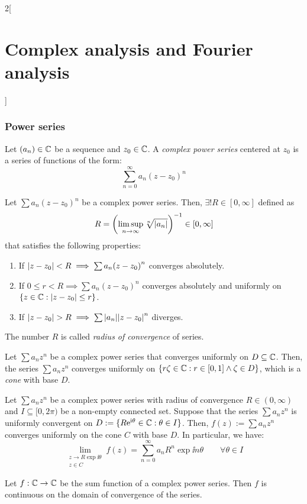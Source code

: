 \documentclass[../../../main.tex]{subfiles}
\begin{document}
\begin{multicols}{2}[\section{Complex analysis and Fourier analysis}]
  \subsubsection{Power series}
  \begin{definition}
    Let $(a_n)\in\mathbb{C}$ be a sequence and $z_0\in\mathbb{C}$. A \emph{complex power series} centered at $z_0$ is a series of functions of the form: $$\sum_{n=0}^\infty a_n{(z-z_0)}^n$$
  \end{definition}
  \begin{theorem}
    Let $\sum a_n{(z-z_0)}^n$ be a complex power series. Then, $\exists! R\in[0,\infty]$ defined as $$R=\left(\limsup_{n\to\infty}\sqrt[n]{\abs{a_n}}\right)^{-1}\in[0,\infty]$$
    that satisfies the following properties:
    \begin{enumerate}
      \item If $\abs{z-z_0}<R\implies\sum a_n{(z-z_0)}^n$ converges absolutely.
      \item If $0\leq r<R\implies\sum a_n{(z-z_0)}^n$ converges absolutely and uniformly on $\{z\in\mathbb{C}:\abs{z-z_0}\leq r\}$.
      \item If $\abs{z-z_0}>R\implies\sum\abs{a_n}{\abs{z-z_0}}^n$ diverges.
    \end{enumerate}
    The number $R$ is called \emph{radius of convergence} of series.
  \end{theorem}
  \begin{theorem}
    Let $\sum a_n{z}^n$ be a complex power series that converges uniformly on $D\subseteq \mathbb{C}$. Then, the series $\sum a_n{z}^n$ converges uniformly on $\{r\zeta\in\mathbb{C}:r\in[0,1]\land\zeta\in D\}$, which is a \emph{cone} with base $D$.
  \end{theorem}
  \begin{corollary}
    Let $\sum a_n{z}^n$ be a complex power series with radius of convergence $R\in(0,\infty)$ and $I\subseteq [0,2\pi)$ be a non-empty connected set. Suppose that the series $\sum a_n{z}^n$ is uniformly convergent on $D:=\{R\mathrm{e}^{\mathrm{i} \theta}\in\mathbb{C}: \theta\in I\}$. Then, $f(z):=\sum a_n{z}^n$ converges uniformly on the cone $C$ with base $D$. In particular, we have: $$\lim_{\substack{z\to R\exp{\ii \theta}\\z\in C}}f(z)=\sum_{n=0}^\infty a_nR^n\exp{\ii n\theta}\qquad\forall\theta\in I$$
  \end{corollary}
  \begin{proposition}
    Let $f:\mathbb{C}\rightarrow\mathbb{C}$ be the sum function of a complex power series. Then $f$ is continuous on the domain of convergence of the series.
  \end{proposition}

\end{multicols}
\end{document}
